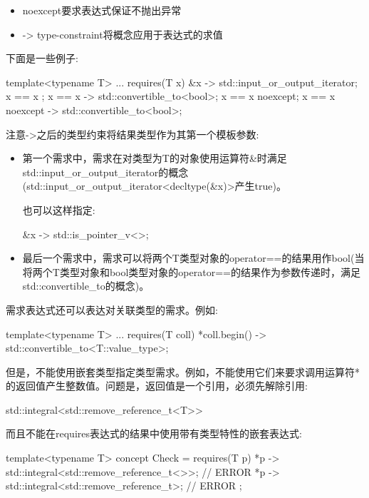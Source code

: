 \begin{itemize}
\item
noexcept要求表达式保证不抛出异常

\item
-> type-constraint将概念应用于表达式的求值
\end{itemize}

下面是一些例子:

\begin{cpp}
template<typename T>
... requires(T x) {
	{ &x } -> std::input_or_output_iterator;
	{ x == x };
	{ x == x } -> std::convertible_to<bool>;
	{ x == x }noexcept;
	{ x == x }noexcept -> std::convertible_to<bool>;
}
\end{cpp}

注意->之后的类型约束将结果类型作为其第一个模板参数:

\begin{itemize}
\item
第一个需求中，需求在对类型为T的对象使用运算符\&时满足std::input\_or\_output\_iterator的概念(std::input\_or\_output\_iterator<decltype(\&x)>产生true)。

也可以这样指定:

\begin{cpp}
{ &x } -> std::is_pointer_v<>;
\end{cpp}

\item
最后一个需求中，需求可以将两个T类型对象的operator==的结果用作bool(当将两个T类型对象和bool类型对象的operator==的结果作为参数传递时，满足std::convertible\_to的概念)。
\end{itemize}

需求表达式还可以表达对关联类型的需求。例如:

\begin{cpp}
template<typename T>
... requires(T coll) {
	{ *coll.begin() } -> std::convertible_to<T::value_type>;
}
\end{cpp}

但是，不能使用嵌套类型指定类型需求。例如，不能使用它们来要求调用运算符*的返回值产生整数值。问题是，返回值是一个引用，必须先解除引用:

\begin{cpp}
std::integral<std::remove_reference_t<T>>
\end{cpp}

而且不能在requires表达式的结果中使用带有类型特性的嵌套表达式:

\begin{cpp}
template<typename T>
concept Check = requires(T p) {
	{ *p } -> std::integral<std::remove_reference_t<>>; // ERROR
	{ *p } -> std::integral<std::remove_reference_t>; // ERROR
};
\end{cpp}

